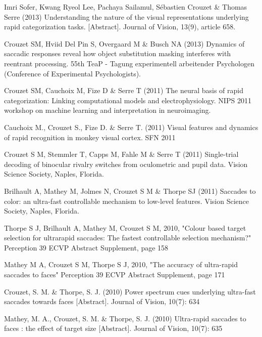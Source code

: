 \documentclass[margin,line]{resume}
\begin{document}
\begin{resume}
\vspace{-2mm} Imri Sofer, Kwang Ryeol Lee, Pachaya Sailamul, Sébastien Crouzet \& Thomas Serre (2013) Understanding the nature of the visual representations underlying rapid categorization tasks.  [Abstract]. Journal of Vision, 13(9), article 658.

\vspace{-2mm} Crouzet SM, Hviid Del Pin S, Overgaard M \& Busch NA (2013) Dynamics of saccadic responses reveal how object substitution masking interferes with reentrant processing. 55th TeaP - Tagung experimentell arbeitender Psychologen (Conference of Experimental Psychologists).

\vspace{-2mm} Crouzet SM, Cauchoix M, Fize D \& Serre T (2011) The neural basis of rapid categorization: Linking computational models and electrophysiology. NIPS 2011 workshop on machine learning and interpretation in neuroimaging.

\vspace{-2mm} Cauchoix M., Crouzet S., Fize D. \& Serre T. (2011) Visual features and dynamics of rapid recognition in monkey visual cortex. SFN 2011

\vspace{-2mm} Crouzet S M, Stemmler T, Capps M, Fahle M \& Serre T (2011) Single-trial decoding of binocular rivalry switches from oculometric and pupil data. Vision Science Society, Naples, Florida.

\vspace{-2mm} Brilhault A, Mathey M, Jolmes N, Crouzet S M \& Thorpe SJ (2011) Saccades to color: an ultra-fast controllable mechanism to low-level features. Vision Science Society, Naples, Florida.

\vspace{-2mm} Thorpe S J, Brilhault A, Mathey M, Crouzet S M, 2010, "Colour based target selection for ultrarapid saccades: The fastest controllable selection mechanism?" Perception 39 ECVP Abstract Supplement, page 158

\vspace{-2mm} Mathey M A, Crouzet S M, Thorpe S J, 2010, "The accuracy of ultra-rapid saccades to faces" Perception 39 ECVP Abstract Supplement, page 171

\vspace{-2mm} Crouzet, S. M. \& Thorpe, S. J. (2010) Power spectrum cues underlying ultra-fast saccades towards faces [Abstract]. Journal of Vision, 10(7): 634

\vspace{-2mm} Mathey, M. A., Crouzet, S. M. \& Thorpe, S. J. (2010) Ultra-rapid saccades to faces : the effect of target size [Abstract]. Journal of Vision, 10(7): 635


\end{resume}
\end{document}
